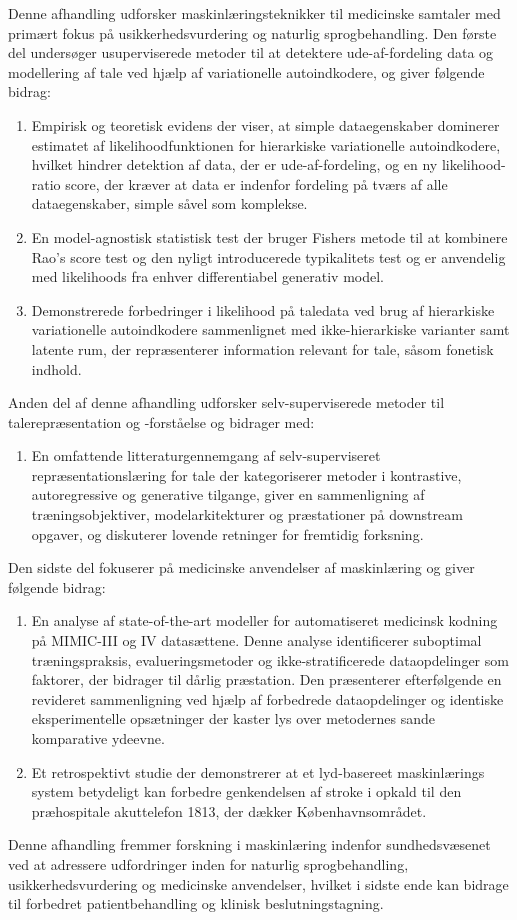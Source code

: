 Denne afhandling udforsker maskinlæringsteknikker til medicinske samtaler med primært fokus på usikkerhedsvurdering og naturlig sprogbehandling. Den første del undersøger usuperviserede metoder til at detektere ude-af-fordeling data og modellering af tale ved hjælp af variationelle autoindkodere, og giver følgende bidrag:
%
\begin{enumerate}[label=(\roman*)] 
    \item Empirisk og teoretisk evidens der viser, at simple dataegenskaber dominerer 
    estimatet af likelihoodfunktionen for hierarkiske variationelle autoindkodere, hvilket hindrer detektion af data, der er ude-af-fordeling, og en ny likelihood-ratio score, der kræver at data er indenfor fordeling på tværs af alle dataegenskaber, simple såvel som komplekse.
    \item En model-agnostisk statistisk test der bruger Fishers metode til at kombinere Rao's score test og den nyligt introducerede typikalitets test og er anvendelig med likelihoods fra enhver differentiabel generativ model.
    \item Demonstrerede forbedringer i likelihood på taledata ved brug af hierarkiske variationelle autoindkodere sammenlignet med ikke-hierarkiske varianter samt latente rum, der repræsenterer information relevant for tale, såsom fonetisk indhold.
\end{enumerate}
%
Anden del af denne afhandling udforsker selv-superviserede metoder til talerepræsentation og -forståelse og bidrager med:
%
\begin{enumerate}[label=(\roman*)] 
    \item En omfattende litteraturgennemgang af selv-superviseret repræsentationslæring for tale der kategoriserer metoder i kontrastive, autoregressive og generative tilgange, giver en sammenligning af træningsobjektiver, modelarkitekturer og præstationer på downstream opgaver, og diskuterer lovende retninger for fremtidig forksning.
\end{enumerate}
%
Den sidste del fokuserer på medicinske anvendelser af maskinlæring og giver følgende bidrag:
%
\begin{enumerate}[label=(\roman*)] 
    \item En analyse af state-of-the-art modeller for automatiseret medicinsk kodning på MIMIC-III og IV datasættene. Denne analyse identificerer suboptimal træningspraksis, evalueringsmetoder og ikke-stratificerede dataopdelinger som faktorer, der bidrager til dårlig præstation. Den præsenterer efterfølgende en revideret sammenligning ved hjælp af forbedrede dataopdelinger og identiske eksperimentelle opsætninger der kaster lys over metodernes sande komparative ydeevne.
    \item Et retrospektivt studie der demonstrerer at et lyd-basereet maskinlærings system betydeligt kan forbedre genkendelsen af stroke i opkald til den præhospitale akuttelefon 1813, der dækker Københavnsområdet.
\end{enumerate}
%
Denne afhandling fremmer forskning i maskinlæring indenfor sundhedsvæsenet ved at adressere udfordringer inden for naturlig sprogbehandling, usikkerhedsvurdering og medicinske anvendelser, hvilket i sidste ende kan bidrage til forbedret patientbehandling og klinisk beslutningstagning.

